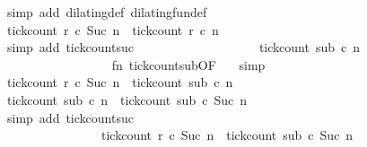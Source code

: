 \begin{isabellebody}
\ {\isacharparenleft}simp\ add{\isacharcolon}\ dilating{\isacharunderscore}def\ dilating{\isacharunderscore}fun{\isacharunderscore}def{\isacharparenright}\isanewline
\ \ \ \ \ \ \ \ \ \ \ \ \ \ \isamarkupfalse%
\ {\isacartoucheopen}tick{\isacharunderscore}count\ r\ c\ {\isacharparenleft}Suc\ n{\isacharparenright}\ {\isacharequal}\ tick{\isacharunderscore}count\ r\ c\ n{\isacartoucheclose}\isanewline
\ \ \ \ \ \ \ \ \ \ \ \ \ \ \ \ \isamarkupfalse%
\ {\isacharparenleft}simp\ add{\isacharcolon}\ tick{\isacharunderscore}count{\isacharunderscore}suc{\isacharparenright}\isanewline
\ \ \ \ \ \ \ \ \ \ \ \ \ \ \isamarkupfalse%
\ \isamarkupfalse%
\ {\isacartoucheopen}{\isachardot}{\isachardot}{\isachardot}\ {\isacharequal}\ tick{\isacharunderscore}count\ sub\ c\ n\isanewline
\ \ \ \ \ \ \ \ \ \ \ \ \ \ \ \ \isamarkupfalse%
\ fn\ tick{\isacharunderscore}count{\isacharunderscore}sub{\isacharbrackleft}OF\ {\isacharasterisk}{\isacharbrackright}\ \isamarkupfalse%
\ simp\isanewline
\ \ \ \ \ \ \ \ \ \ \ \ \ \ \isamarkupfalse%
\ \isamarkupfalse%
\ {\isacartoucheopen}tick{\isacharunderscore}count\ r\ c\ {\isacharparenleft}Suc\ n{\isacharparenright}\ {\isacharequal}\ tick{\isacharunderscore}count\ sub\ c\ n\ \isacommand{{\isachardot}}\isamarkupfalse%
\isanewline
\ \ \ \ \ \ \ \ \ \ \ \ \ \ \isamarkupfalse%
\ \isamarkupfalse%
\ {\isacartoucheopen}tick{\isacharunderscore}count\ sub\ c\ n\ {\isasymle}\ tick{\isacharunderscore}count\ sub\ c\ {\isacharparenleft}Suc\ n\isanewline
\ \ \ \ \ \ \ \ \ \ \ \ \ \ \ \ \isamarkupfalse%
\ {\isacharparenleft}simp\ add{\isacharcolon}\ tick{\isacharunderscore}count{\isacharunderscore}suc{\isacharparenright}\isanewline
\ \ \ \ \ \ \ \ \ \ \ \ \ \ \isamarkupfalse%
\ \isamarkupfalse%
\isanewline
\ \ \ \ \ \ \ \ \ \ \ \ \ \ \ \ {\isacartoucheopen}tick{\isacharunderscore}count\ r\ c\ {\isacharparenleft}Suc\ n{\isacharparenright}\ {\isasymle}\ tick{\isacharunderscore}count\ sub\ c\ {\isacharparenleft}Suc\ n\ \isamarkupfalse%

\end{isabellebody}
